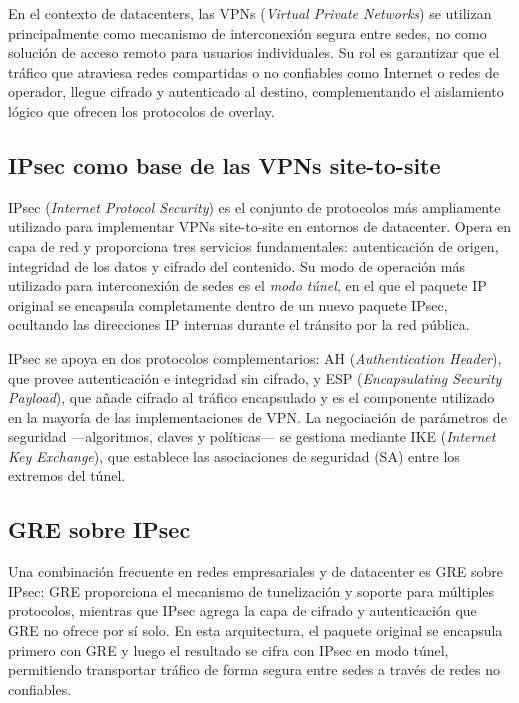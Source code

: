 
En el contexto de datacenters, las VPNs (\textit{Virtual Private Networks}) se utilizan principalmente como mecanismo de interconexión segura entre sedes, no como solución de acceso remoto para usuarios individuales. Su rol es garantizar que el tráfico que atraviesa redes compartidas o no confiables como Internet o redes de operador, llegue cifrado y autenticado al destino, complementando el aislamiento lógico que ofrecen los protocolos de overlay.

\subsection{IPsec como base de las VPNs site-to-site}

IPsec (\textit{Internet Protocol Security}) es el conjunto de protocolos más ampliamente utilizado para implementar VPNs site-to-site en entornos de datacenter. Opera en capa de red y proporciona tres servicios fundamentales: autenticación de origen, integridad de los datos y cifrado del contenido. Su modo de operación más utilizado para interconexión de sedes es el \textit{modo túnel}, en el que el paquete IP original se encapsula completamente dentro de un nuevo paquete IPsec, ocultando las direcciones IP internas durante el tránsito por la red pública.

IPsec se apoya en dos protocolos complementarios: AH (\textit{Authentication Header}), que provee autenticación e integridad sin cifrado, y ESP (\textit{Encapsulating Security Payload}), que añade cifrado al tráfico encapsulado y es el componente utilizado en la mayoría de las implementaciones de VPN. La negociación de parámetros de seguridad —algoritmos, claves y políticas— se gestiona mediante IKE (\textit{Internet Key Exchange}), que establece las asociaciones de seguridad (SA) entre los extremos del túnel.

\subsection{GRE sobre IPsec}

Una combinación frecuente en redes empresariales y de datacenter es GRE sobre IPsec: GRE proporciona el mecanismo de tunelización y soporte para múltiples protocolos, mientras que IPsec agrega la capa de cifrado y autenticación que GRE no ofrece por sí solo. En esta arquitectura, el paquete original se encapsula primero con GRE y luego el resultado se cifra con IPsec en modo túnel, permitiendo transportar tráfico de forma segura entre sedes a través de redes no confiables.

